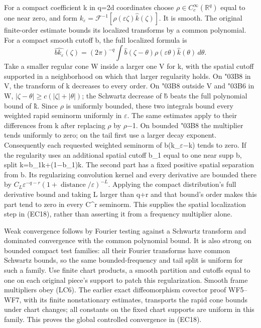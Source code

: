 \documentclass[
  11pt,
]{article}
\begin{document}
For a compact coefficient k in q=2d coordinates choose
\(\rho\in C_c^\infty(\mathbb R^q)\) equal to one near zero, and form
\(k_\varepsilon=\mathcal F^{-1}[\rho(\varepsilon\zeta)\widehat k(\zeta)]\).
It is smooth. The original finite-order estimate bounds its localized
transforms by a common polynomial. For a compact smooth cutoff b, the
full localized formula is \[
\widehat{b k_\varepsilon}(\zeta)
 =(2\pi)^{-q}\int\widehat b(\zeta-\theta)
            \rho(\varepsilon\theta)\widehat k(\theta)\,d\theta.
\tag{LC6}
\] Take a smaller regular cone W inside a larger one V for k, with the
spatial cutoff supported in a neighborhood on which that larger
regularity holds. On {\ReaderSymbols\char"03B8} in V, the transform of k decreases to every
order. On {\ReaderSymbols\char"03B8} outside V and {\ReaderSymbols\char"03B6} in W,
\(|\zeta-\theta|\geq c(|\zeta|+|\theta|)\); the Schwartz decrease of b̂
beats the full polynomial bound of k̂. Since \ensuremath{\rho} is uniformly bounded,
these two integrals bound every weighted rapid seminorm uniformly in \ensuremath{\varepsilon}.
The same estimates apply to their differences from k after replacing \ensuremath{\rho}
by \ensuremath{\rho}−1. On bounded {\ReaderSymbols\char"03B8} the multiplier tends uniformly to zero; on the tail
first use a larger decay exponent. Consequently each requested weighted
seminorm of b(k\_\ensuremath{\varepsilon}−k) tends to zero. If the regularity uses an
additional spatial cutoff b\_1 equal to one near supp b, split
k=b\_1k+(1−b\_1)k. The second part has a fixed positive spatial
separation from b. Its regularizing convolution kernel and every
derivative are bounded there by
\(C_L\varepsilon^{-q-r}(1+\operatorname{distance}/\varepsilon)^{-L}\).
Applying the compact distribution's full derivative bound and taking L
larger than q+r and that bound's order makes this part tend to zero in
every C\^{}r seminorm. This supplies the spatial localization step in
(EC18), rather than asserting it from a frequency multiplier alone.

Weak convergence follows by Fourier testing against a Schwartz transform
and dominated convergence with the common polynomial bound. It is also
strong on bounded compact test families: all their Fourier transforms
have common Schwartz bounds, so the same bounded-frequency and tail
split is uniform for such a family. Use finite chart products, a smooth
partition and cutoffs equal to one on each original piece's support to
patch this regularization. Smooth frame multipliers obey (LC6). The
earlier exact diffeomorphism covector proof WF5--WF7, with its finite
nonstationary estimates, transports the rapid cone bounds under chart
changes; all constants on the fixed chart supports are uniform in this
family. This proves the global controlled convergence in (EC18).
\end{document}
